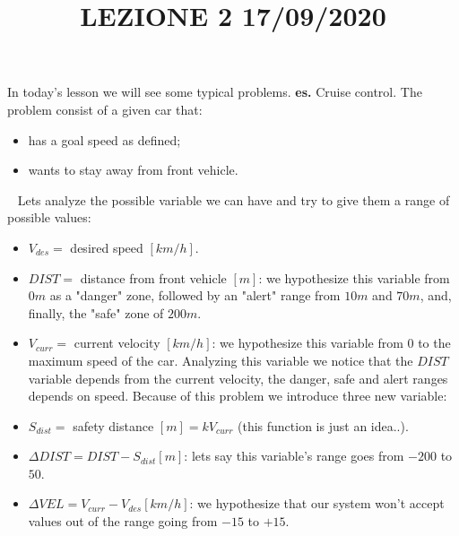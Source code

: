 \title{LEZIONE 2 17/09/2020}\newline
\newline
In today's lesson we will see some typical problems.\newline
\newline
\textbf{es.} Cruise control.\newline
The problem consist of a given car that:
\begin{itemize}
    \item has a goal speed as defined;
    \item wants to stay away from front vehicle.
\end{itemize}
\ \newline
Lets analyze the possible variable we can have and try to give them a range of possible values:
\begin{itemize}
    \item $V_{des} = $ desired speed $[km/h]$.
    \item $DIST =$ distance from front vehicle $[m]$: we hypothesize this variable from $0m$ as a "danger" zone, followed by an "alert" range from $10m$ and $70m$, and, finally, the "safe" zone of $200m$.
    \item $V_{curr} = $ current velocity $[km/h]$: we hypothesize this variable from $0$ to the maximum speed of the car. Analyzing this variable we notice that the $DIST$ variable depends from the current velocity, the danger, safe and alert ranges depends on speed. Because of this problem we introduce three new variable:
    \item $S_{dist} = $ safety distance $[m] = k V_{curr}$ (this function is just an idea..).
    \item $\Delta DIST = DIST - S_{dist} [m]$: lets say this variable's range goes from $-200$ to $50$.
    \item $\Delta VEL = V_{curr} - V_{des} [km/h]$: we hypothesize that our system won't accept values out of the range going from $-15$ to $+15$.
\end{itemize}
\ \newline
{}\newline
{}